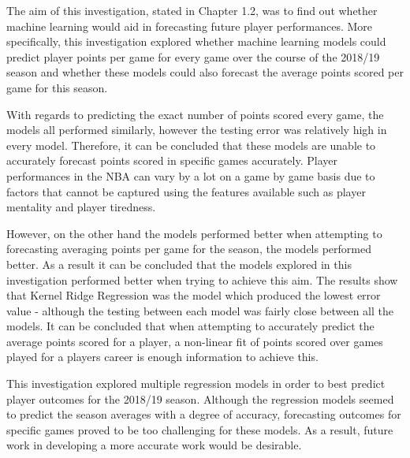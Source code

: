 \documentclass[a4paper,11pt,twoside]{article}
\begin{document}
The aim of this investigation, stated in Chapter 1.2, was to find out whether machine learning would aid in forecasting future player performances. More specifically, this investigation explored whether machine learning models could predict player points per game for every game over the course of the 2018/19 season and whether these models could also forecast the average points scored per game for this season. 

With regards to predicting the exact number of points scored every game, the models all performed similarly, however the testing error was relatively high in every model. Therefore, it can be concluded that these models are unable to accurately forecast  points scored in specific games accurately. Player performances in the NBA can vary by a lot on a game by game basis due to factors that cannot be captured using the features available such as player mentality and player tiredness.

However, on the other hand the models performed better when attempting to forecasting averaging points per game for the season, the models performed better. As a result it can be concluded that the models explored in this investigation performed better when trying to achieve this aim. The results show that Kernel Ridge Regression was the model which produced the lowest error value - although the testing between each model was fairly close between all the models. It can be concluded that when attempting to accurately predict the average points scored for a player, a non-linear fit of points scored over games played for a players career is enough information to achieve this.

\vspace{10mm}
This investigation explored multiple regression models in order to best predict player outcomes for the 2018/19 season. Although the regression models seemed to predict the season averages with a degree of accuracy, forecasting outcomes for specific games proved to be too challenging for these models. As a result, future work in developing a more accurate work would be desirable.
\end{document}
